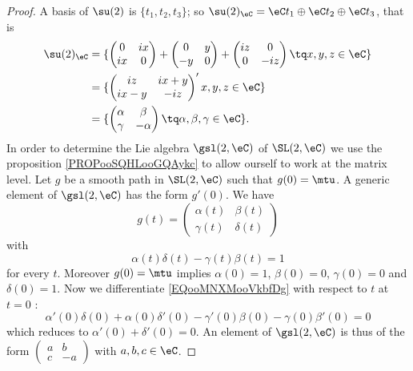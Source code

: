 \begin{proof}
    A basis of \( \su(2)\) is \( \{ t_1,t_2,t_3 \}\); so \( \su(2)_{\eC}=\eC t_1\oplus \eC t_2\oplus \eC t_3\), that is
    \begin{subequations}
        \begin{align}
            \su(2)_\eC&=\{ \begin{pmatrix}
            0    &   ix    \\ 
        ix    &   0    
    \end{pmatrix}+\begin{pmatrix}
    0    &   y    \\ 
-y    &   0    
\end{pmatrix}+\begin{pmatrix}
iz    &   0    \\ 
0    &   -iz    
\end{pmatrix}\tq x,y,z\in \eC\}\\
&=\{\begin{pmatrix}
iz    &   ix+y    \\ 
ix-y    &   -iz    
\end{pmatrix}\rq x,y,z\in \eC\}\\
&=\{\begin{pmatrix}
\alpha    &   \beta    \\ 
\gamma    &   -\alpha    
\end{pmatrix}\tq \alpha,\beta,\gamma\in \eC\}.
        \end{align}
    \end{subequations}
    In order to determine the Lie algebra \( \gsl(2,\eC)\) of \( \SL(2,\eC)\) we use the proposition \ref{PROPooSQHLooGQAykc} to allow ourself to work at the matrix level. Let \( g\) be a smooth path in \( \SL(2,\eC)\) such that \( g(0)=\mtu\). A generic element of \( \gsl(2,\eC)\) has the form \( g'(0)\). We have
    \begin{equation}
        g(t)=\begin{pmatrix}
            \alpha(t)    &   \beta(t)    \\ 
            \gamma(t)    &   \delta(t)    
        \end{pmatrix}
    \end{equation}
    with 
    \begin{equation}        \label{EQooMNXMooVkbfDg}
        \alpha(t)\delta(t)-\gamma(t)\beta(t)=1
    \end{equation}
    for every \( t\).  Moreover \( g(0)=\mtu\) implies \( \alpha(0)=1\), \( \beta(0)=0\), \( \gamma(0)=0\) and \( \delta(0)=1\). Now we differentiate \eqref{EQooMNXMooVkbfDg} with respect to \( t\) at \( t=0\) :
    \begin{equation}
        \alpha'(0)\delta(0)+\alpha(0)\delta'(0)-\gamma'(0)\beta(0)-\gamma(0)\beta'(0)=0
    \end{equation}
    which reduces to \( \alpha'(0)+\delta'(0)=0\). An element of \( \gsl(2,\eC)\) is thus of the form \( \begin{pmatrix}
        a    &   b    \\ 
        c    &   -a    
    \end{pmatrix}\) with \( a,b,c\in \eC\).
\end{proof}

